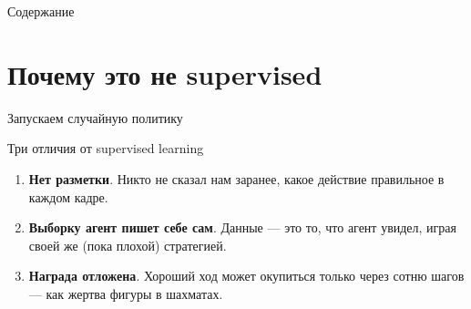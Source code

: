 \documentclass[aspectratio=169,12pt,t,compress]{beamer}
\begin{document}
\begin{frame}
	\titlepage
\end{frame}

\begin{frame}{Содержание}
	\tableofcontents
\end{frame}


\section{Почему это не supervised}


\begin{frame}{Запускаем случайную политику}
\end{frame}

\begin{frame}{Три отличия от supervised learning}
	\begin{enumerate}
		\item<1-> \textbf{Нет разметки}. Никто не сказал нам заранее, какое действие правильное в каждом кадре.
		\item<2-> \textbf{Выборку агент пишет себе сам}. Данные --- это то, что агент увидел, играя своей же (пока плохой) стратегией.
		\item<3-> \textbf{Награда отложена}. Хороший ход может окупиться только через сотню шагов --- как жертва фигуры в шахматах.
	\end{enumerate}

	\vspace{0.5em}

\end{frame}
\end{document}
